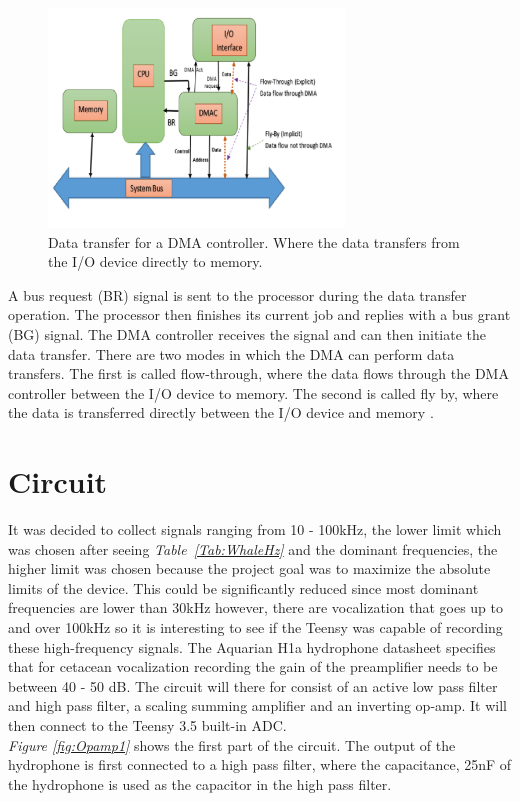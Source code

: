 \begin{figure}[h]
    \centering
    \includegraphics[width=0.70\textwidth]{graphics/DMA.png}
    \caption{Data transfer for a DMA controller. Where the data transfers from the I/O device directly to memory. \cite{ahmed_design_2019}}
    \label{fig:DMAcontroller}
\end{figure}

A bus request (BR) signal is sent to the processor during the data transfer operation.
The processor then finishes its current job and replies with a bus grant (BG) signal.
The DMA controller receives the signal and can then initiate the data transfer.
There are two modes in which the DMA can perform data transfers.
The first is called flow-through, where the data flows through the DMA controller between the I/O device to memory.
The second is called fly by, where the data is transferred directly between the I/O device and memory \cite{ahmed_design_2019}.



\section{Circuit}\label{sec:CircResult}

It was decided to collect signals ranging from 10 - 100kHz, the lower limit which was chosen after seeing \textit{Table~\ref{Tab:WhaleHz}} and the dominant frequencies, the higher limit was chosen because the project goal was to maximize the absolute limits of the device.
This could be significantly reduced since most dominant frequencies are lower than 30kHz however, there are vocalization that goes up to and over 100kHz so it is interesting to see if the Teensy was capable of recording these high-frequency signals.
The Aquarian H1a hydrophone datasheet specifies that for cetacean vocalization recording the gain of the preamplifier needs to be between 40 - 50 dB\cite{noauthor_aquarian_nodate}.
The circuit will there for consist of an active low pass filter and high pass filter, a scaling summing amplifier and an inverting op-amp.
It will then connect to the Teensy 3.5 built-in ADC.\\
\indent \textit{Figure \ref{fig:Opamp1}} shows the first part of the circuit.
The output of the hydrophone is first connected to a high pass filter, where the capacitance, 25nF of the hydrophone is used as the capacitor in the high pass filter.

